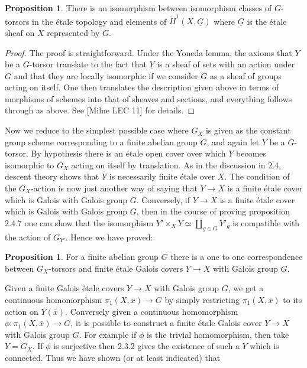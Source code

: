 \documentclass{ucbthesis}
\theoremstyle{definition}
\theoremstyle{theorem}
\newtheorem{prop}[thm]{Proposition}
\begin{document}
\begin{prop}
There is an isomorphism between isomorphism classes of $G$-torsors in the \'{e}tale topology and elements of $\check{H}^{1}(X,\underline{G})$ where $\underline{G}$ is the \'{e}tale sheaf on $X$ represented by $G$.
\end{prop}
\begin{proof}
The proof is straightforward. Under the Yoneda lemma, the axioms that $Y$ be a $G$-torsor translate to the fact that $\underline{Y}$ is a sheaf of sets with an action under $\underline{G}$ and that they are locally isomorphic if we consider $\underline{G}$ as a sheaf of groups acting on itself. One then translates the description given above in terms of morphisms of schemes into that of sheaves and sections, and everything follows through as above. See [Milne LEC 11] for details. 
\end{proof}

Now we reduce to the simplest possible case where $G_{X}$ is given as the constant group scheme corresponding to a finite abelian group $G$, and again let $Y$ be a $G$-torsor. By hypothesis there is an \'{e}tale open cover over which $Y$ becomes isomorphic to $G_{X}$ acting on itself by translation. As in the discussion in 2.4, descent theory shows that $Y$ is necessarily finite \'{e}tale over $X$. The condition of the $G_{X}$-action is now just another way of saying that $Y\rightarrow X$ is a finite \'{e}tale cover which is Galois with Galois group $G$. Conversely, if $Y\rightarrow X$ is a finite \'{e}tale cover which is Galois with Galois group $G$,
     then in the course of proving proposition 2.4.7 one can show that the isomorphism $Y'\times_{X} Y \simeq \coprod\limits_{g\in G} Y'_{g}$ is compatible with the action of $G_{Y'}$. Hence we have proved:

\begin{prop}
For a finite abelian group $G$ there is a one to one correspondence between $G_{X}$-torsors and finite \'{e}tale Galois covers $Y\rightarrow X$ with Galois group $G$. 
\end{prop}

Given a finite Galois \'{e}tale covers $Y\rightarrow X$ with Galois group $G$, we get a continuous homomorphism $\pi_{1}(X,\bar{x}) \rightarrow G$ by simply restricting $\pi_{1}(X,\bar{x})$ to its action on $Y(\bar{x})$. Conversely given a continuous homomorphism $\phi:\pi_{1}(X,\bar{x}) \rightarrow G$, it is possible to construct a finite \'{e}tale Galois cover $Y\rightarrow X$  with Galois group $G$. For example if $\phi$ is the trivial homomorphism, then take $Y=G_{X}$. If $\phi$ is surjective then 2.3.2 gives the existence of such a $Y$ which is connected. Thus we have shown (or at least indicated) that 
\end{document}
